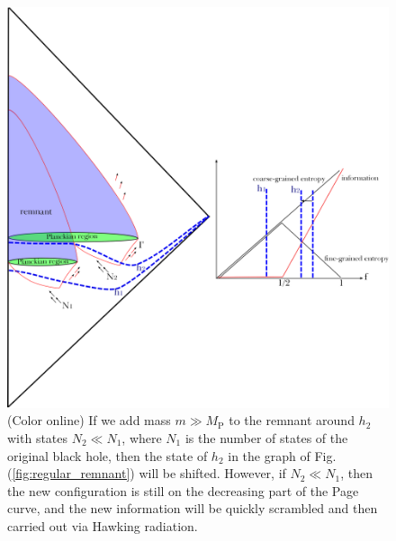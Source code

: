 \documentclass[12pt]{article}
\newcommand{\2}{$^2$}
\newcommand{\3}{$^3$}
\newcommand{\4}{$_4$}
\newcommand{\5}{$_5$}
\begin{document}
\begin{figure}
\begin{center}
\includegraphics[scale=0.45]{regular_remnant_duplication-eps-converted-to.pdf}
\caption{\label{fig:regular_remnant_duplication}(Color online) If we add mass $m \gg M_{\text{P}}$ to the remnant around $h_{2}$ with states $N_{2} \ll N_{1}$, where $N_{1}$ is the number of states of the original black hole, then the state of $h_{2}$ in the graph of Fig.(\ref{fig:regular_remnant}) will be shifted. However, if $N_{2} \ll N_{1}$, then the new configuration is still on the decreasing part of the Page curve, and the new information will be quickly scrambled and then carried out via Hawking radiation.}
\end{center}
\end{figure}
\end{document}
